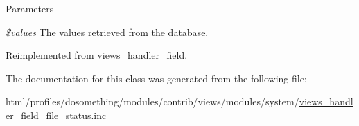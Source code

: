 \begin{DoxyParams}{Parameters}
\item[{\em \$values}]The values retrieved from the database. \end{DoxyParams}


Reimplemented from \hyperlink{classviews__handler__field_a82ff951c5e9ceb97b2eab86f880cbc1e}{views\_\-handler\_\-field}.

The documentation for this class was generated from the following file:\begin{DoxyCompactItemize}
\item 
html/profiles/dosomething/modules/contrib/views/modules/system/\hyperlink{views__handler__field__file__status_8inc}{views\_\-handler\_\-field\_\-file\_\-status.inc}\end{DoxyCompactItemize}
